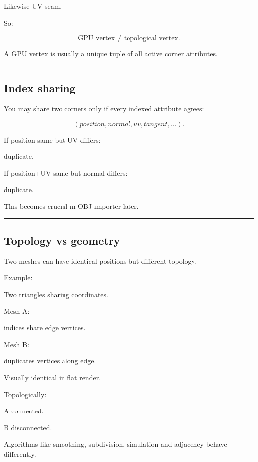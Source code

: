 Likewise UV seam.

So:

\[
\boxed{
\text{GPU vertex}
\neq
\text{topological vertex}.
}
\]

A GPU vertex is usually a unique tuple of all active corner attributes.

\begin{center}\rule{0.5\linewidth}{0.5pt}\end{center}

\subsection{Index sharing}\label{04-visual-computing-ii-ch041-index-sharing}

You may share two corners only if every indexed attribute agrees:

\[
(position,normal,uv,tangent,\ldots).
\]

If position same but UV differs:

duplicate.

If position+UV same but normal differs:

duplicate.

This becomes crucial in OBJ importer later.

\begin{center}\rule{0.5\linewidth}{0.5pt}\end{center}

\subsection{Topology vs geometry}\label{04-visual-computing-ii-ch041-topology-vs-geometry}

Two meshes can have identical positions but different topology.

Example:

Two triangles sharing coordinates.

Mesh A:

indices share edge vertices.

Mesh B:

duplicates vertices along edge.

Visually identical in flat render.

Topologically:

A connected.

B disconnected.

Algorithms like smoothing, subdivision, simulation and adjacency behave differently.

